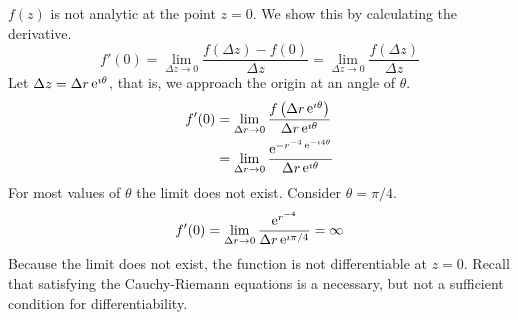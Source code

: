 {\begin{Solution}
  $f(z)$ is not analytic at the point $z = 0$.  We show this by calculating
  the derivative.
  \[
  f'(0) = \lim_{\Delta z \to 0} \frac{f(\Delta z) - f(0)}{\Delta z}
  = \lim_{\Delta z \to 0} \frac{f(\Delta z)}{\Delta z}
  \]
  Let $\Delta z = \Delta r \mathop{\mathrm{e}}\nolimits^{\imath \theta}$, that is, we approach the origin
  at an angle of $\theta$.
  \begin{align*}
    f'(0)   &= \lim_{\Delta r \to 0} \frac{ f\left( \Delta r \mathop{\mathrm{e}}\nolimits^{\imath \theta} \right)}{\Delta r \mathop{\mathrm{e}}\nolimits^{\imath \theta} } 
    \\
    &= \lim_{\Delta r \to 0} \frac{ \mathop{\mathrm{e}}\nolimits^{- r^{-4} \mathop{\mathrm{e}}\nolimits^{-\imath 4 \theta} } }{ \Delta r \mathop{\mathrm{e}}\nolimits^{\imath \theta} }
  \end{align*}
  For most values of $\theta$ the limit does not exist.  Consider $\theta = \pi / 4$.
  \[
  f'(0) = \lim_{\Delta r \to 0} \frac{ \mathop{\mathrm{e}}\nolimits^{r^{-4} } }{ \Delta r \mathop{\mathrm{e}}\nolimits^{\imath \pi / 4} } = \infty
  \]
  Because the limit does not exist,  the function is 
  not differentiable at $z = 0$.  Recall that satisfying the Cauchy-Riemann 
  equations is a necessary, but not a sufficient condition for 
  differentiability.  
\end{Solution}





}
